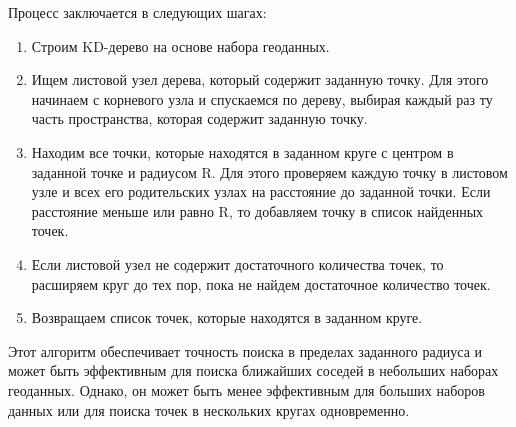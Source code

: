 Процесс заключается в следующих шагах:

\begin{enumerate}
    \item Строим KD-дерево на основе набора геоданных.
    \item Ищем листовой узел дерева, который содержит заданную точку. Для этого начинаем с корневого узла и спускаемся по дереву, выбирая каждый раз ту часть пространства, которая содержит заданную точку.
    \item Находим все точки, которые находятся в заданном круге с центром в заданной точке и радиусом R. Для этого проверяем каждую точку в листовом узле и всех его родительских узлах на расстояние до заданной точки. Если расстояние меньше или равно R, то добавляем точку в список найденных точек.
    \item Если листовой узел не содержит достаточного количества точек, то расширяем круг до тех пор, пока не найдем достаточное количество точек.
    \item Возвращаем список точек, которые находятся в заданном круге.
\end{enumerate}

Этот алгоритм обеспечивает точность поиска в пределах заданного радиуса и может быть эффективным для поиска ближайших соседей в небольших наборах геоданных. Однако, он может быть менее эффективным для больших наборов данных или для поиска точек в нескольких кругах одновременно.

